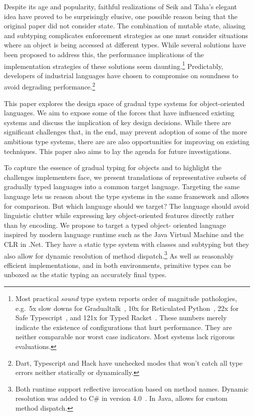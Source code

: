 \documentclass[a4paper,USenglish]{tex/lipics-v2016}
\begin{document}
Despite its age and popularity, faithful realizations of Seik and Taha's elegant
idea have proved to be surprisingly elusive, one possible reason being that the
original paper did not consider state. The combination of mutable state,
aliasing and subtyping complicates enforcement strategies as one must consider
situations where an object is being accessed at different types. While several
solutions have been proposed to address this, the performance implications of
the implementation strategies of these solutions seem daunting.\footnote{Most
practical \emph{sound} type system reports order of magnitude pathologies,
e.g.~5x slow downs for Gradualtalk~\cite{allende13}, 10x for Reticulated
Python~\cite{siek14}, 22x for Safe Typescript~\cite{safe-typescript}, and 121x
for Typed Racket~\cite{popl16}. These numbers merely indicate the existence of
configurations that hurt performance.  They are neither comparable nor worst
case indicators. Most systems lack rigorous evaluations. } Predictably,
developers of industrial languages have chosen to compromise on soundness to
avoid degrading performance.\footnote{Dart, Typescript and Hack have unchecked
modes that won't catch all type errors neither statically or dynamically.}

This paper explores the design space of gradual type systems for object-oriented
languages. We aim to expose some of the forces that have influenced existing
systems and discuss the implication of key design decisions. While there are
significant challenges that, in the end, may prevent adoption of some of the
more ambitious type systems, there are are also opportunities for improving on
existing techniques.  This paper also aims to lay the agenda for future
investigations.

To capture the essence of gradual typing for objects and to highlight the
challenges implementers face, we present translations of representative subsets
of gradually typed languages into a common target language. Targeting the same
language lets us reason about the type systems in the same framework and allows
for comparison. But which language should we target? The language should avoid
linguistic clutter while expressing key object-oriented features directly rather
than by encoding. We propose to target a typed object- oriented language
inspired by modern language runtime such as the Java Virtual Machine and the
CLR in .Net. They have a static type system with classes and subtyping but they
also allow for dynamic resolution of method dispatch.\footnote{Both runtime
support reflective invocation based on method names. Dynamic resolution was
added to C\# in version 4.0~\cite{BAT14}. In Java,  allows for
custom method dispatch.} As well as reasonably efficient implementations, and in
both environments, primitive types can be unboxed as the static typing an
accurately final types.
\end{document}
